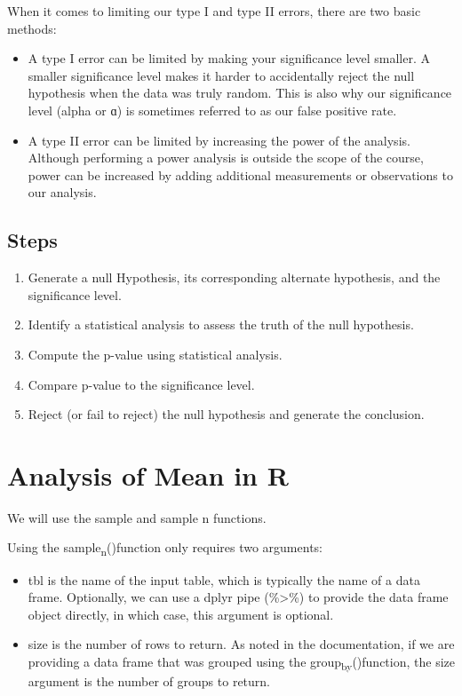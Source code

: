 \documentclass[11pt]{article}
\begin{document}
When it comes to limiting our type I and type II errors, there are two basic methods:

\begin{itemize}
\item A type I error can be limited by making your significance level smaller. A smaller significance level makes it harder to accidentally reject the null hypothesis when the data was truly random. This is also why our significance level (alpha or ɑ) is sometimes referred to as our false positive rate.
\item A type II error can be limited by increasing the power of the analysis. Although performing a power analysis is outside the scope of the course, power can be increased by adding additional measurements or observations to our analysis.
\end{itemize}

\subsection{Steps}
\label{sec:org49e288e}

\begin{enumerate}
\item Generate a null Hypothesis, its corresponding alternate hypothesis, and the significance level.
\item Identify a statistical analysis to assess the truth of the null hypothesis.
\item Compute the p-value using statistical analysis.
\item Compare p-value to the significance level.
\item Reject (or fail to reject) the null hypothesis and generate the conclusion.
\end{enumerate}

\section{Analysis of Mean in R}
\label{sec:orgeb5194e}

We will use the sample and sample n functions.

Using the sample\textsubscript{n}()function only requires two arguments:

\begin{itemize}
\item tbl is the name of the input table, which is typically the name of a data frame. Optionally, we can use a dplyr pipe (\%>\%) to provide the data frame object directly, in which case, this argument is optional.
\item size is the number of rows to return. As noted in the documentation, if we are providing a data frame that was grouped using the group\textsubscript{by}()function, the size argument is the number of groups to return.
\end{itemize}
\end{document}
